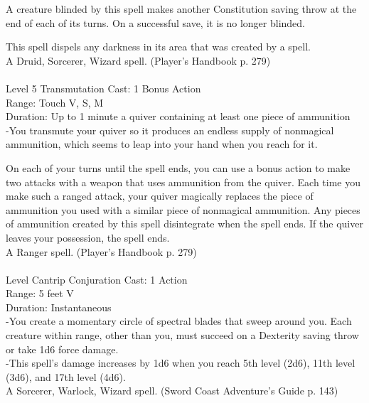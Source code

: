 \documentclass[10pt,twocolumn]{report}
\begin{document}
A creature blinded by this spell makes another Constitution saving throw at the end of each of its turns. On a successful save, it is no longer blinded.

This spell dispels any darkness in its area that was created by a spell.\\
A Druid, Sorcerer, Wizard spell. (Player's Handbook p. 279) \\


 \\
Level 5 \quad Transmutation \quad Cast: 1 Bonus Action\\
Range: Touch \quad V, S, M\\
Duration: Up to 1 minute \quad a quiver containing at least one piece of ammunition\\
-You transmute your quiver so it produces an endless supply of nonmagical ammunition, which seems to leap into your hand when you reach for it.

On each of your turns until the spell ends, you can use a bonus action to make two attacks with a weapon that uses ammunition from the quiver. Each time you make such a ranged attack, your quiver magically replaces the piece of ammunition you used with a similar piece of nonmagical ammunition. Any pieces of ammunition created by this spell disintegrate when the spell ends. If the quiver leaves your possession, the spell ends.\\
A Ranger spell. (Player's Handbook p. 279) \\


 \\
Level Cantrip \quad Conjuration \quad Cast: 1 Action\\
Range: 5 feet \quad V\\
Duration: Instantaneous \quad \\
-You create a momentary circle of spectral blades that sweep around you.
Each creature within range, other than you, must succeed on a Dexterity saving throw or take 1d6 force damage.\\
-This spell's damage increases by 1d6 when you reach 5th level (2d6), 11th level (3d6), and 17th level (4d6).\\
A Sorcerer, Warlock, Wizard spell. (Sword Coast Adventure's Guide p. 143) \\
\end{document}
